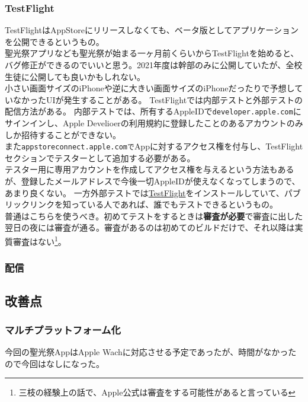 \documentclass[dvipdfmx,jb5]{jreport}
\newcommand{\impact}[1]{\textbf{\gtfamily #1}}
\newcommand{\link}[2]{\href{#2}{#1}}
\begin{document}
\subsubsection{TestFlight}\label{sec:TestFlight}
TestFlightはAppStoreにリリースしなくても、ベータ版としてアプリケーションを公開できるというもの。\\
聖光祭アプリなども聖光祭が始まる一ヶ月前くらいからTestFlightを始めると、バグ修正ができるのでいいと思う。2021年度は幹部のみに公開していたが、全校生徒に公開しても良いかもしれない。\\
小さい画面サイズのiPhoneや逆に大きい画面サイズのiPhoneだったりで予想していなかったUIが発生することがある。
TestFlightでは内部テストと外部テストの配信方法がある。
内部テストでは、所有するAppleIDで\texttt{developer.apple.com}にサインインし、Apple Develioerの利用規約に登録したことのあるアカウントのみしか招待することができない。\\
また\texttt{appstoreconnect.apple.comで}Appに対するアクセス権を付与し、TestFlightセクションでテスターとして追加する必要がある。\\
テスター用に専用アカウントを作成してアクセス権を与えるという方法もあるが、登録したメールアドレスで今後一切AppleIDが使えなくなってしまうので、あまり良くない。
一方外部テストでは\link{TestFlight}{https://itunes.apple.com/jp/app/testflight/id899247664?mt=8}をインストールしていて、パブリックリンクを知っている人であれば、誰でもテストできるというもの。\\
普通はこちらを使うべき。初めてテストをするときは\impact{審査が必要}で審査に出した翌日の夜には審査が通る。審査があるのは初めてのビルドだけで、それ以降は実質審査はない\footnote{三枝の経験上の話で、Apple公式は審査をする可能性があると言っている}。\\
\subsubsection{配信}
\subsection{改善点}
\subsubsection{マルチプラットフォーム化}
今回の聖光祭AppはApple Wachに対応させる予定であったが、時間がなかったので今回はなしになった。
\end{document}
